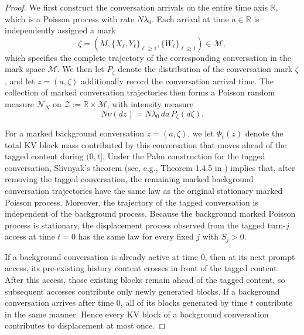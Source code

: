 \documentclass{article}
\theoremstyle{definition}
\begin{document}
\begin{proof}
We first construct the conversation arrivals on the entire time axis $\mathbb R$, which is a Poisson process with rate $N\lambda_0$. Each arrival at time $a\in\mathbb R$ is independently assigned a mark
\begin{equation*}
    \zeta=\left(M,\{X_\ell,Y_\ell\}_{\ell\geq1},\{W_\ell\}_{\ell\geq1}\right)\in\mathcal M,
\end{equation*}
which specifies the complete trajectory of the corresponding conversation in the mark space $\mathcal M$. We then let $P_\zeta$ denote the distribution of the conversation mark $\zeta$, and let $z=(a,\zeta)$ additionally record the conversation arrival time. The collection of marked conversation trajectories then forms a Poisson random measure $\mathcal N_N$ on $\mathcal Z:=\mathbb R\times\mathcal M$, with intensity measure
\begin{equation*}
    N\nu(dz)=N\lambda_0\,da\,P_\zeta(d\zeta).
\end{equation*}

For a marked background conversation $z=(a,\zeta)$, we let $\Phi_t(z)$ denote the total KV block mass contributed by this conversation that moves ahead of the tagged content during $(0,t]$.  Under the Palm construction for the tagged conversation, Slivnyak's theorem (see, e.g., Theorem 1.4.5 in \cite{baccelli2010stochastic}) implies that, after removing the tagged conversation, the remaining marked background conversation trajectories have the same law as the original stationary marked Poisson process. Moreover, the trajectory of the tagged conversation is independent of the background process. Because the background marked Poisson process is stationary, the displacement process observed from the tagged turn-$j$ access at time $t=0$ has the same law for every fixed $j$ with $S_j>0$.

If a background conversation is already active at time $0$, then at its next prompt access, its pre-existing history content crosses in front of the tagged content. After this access, those existing blocks remain ahead of the tagged content, so subsequent accesses contribute only newly generated blocks. If a background conversation arrives after time $0$, all of its blocks generated by time $t$ contribute in the same manner. Hence every KV block of a background conversation contributes to displacement at most once. 


\end{proof}
\end{document}
